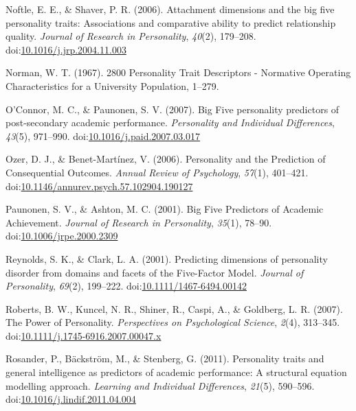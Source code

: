 \documentclass[,man]{apa6}
\theoremstyle{definition}
\theoremstyle{definition}
\theoremstyle{definition}
\theoremstyle{remark}
\begin{document}
\leavevmode\hypertarget{ref-Noftle2006}{}%
Noftle, E. E., \& Shaver, P. R. (2006). Attachment dimensions and the
big five personality traits: Associations and comparative ability to
predict relationship quality. \emph{Journal of Research in Personality},
\emph{40}(2), 179--208.
doi:\href{https://doi.org/10.1016/j.jrp.2004.11.003}{10.1016/j.jrp.2004.11.003}

\leavevmode\hypertarget{ref-Norman1967}{}%
Norman, W. T. (1967). 2800 Personality Trait Descriptors - Normative
Operating Characteristics for a University Population, 1--279.

\leavevmode\hypertarget{ref-OConnor2007}{}%
O'Connor, M. C., \& Paunonen, S. V. (2007). Big Five personality
predictors of post-secondary academic performance. \emph{Personality and
Individual Differences}, \emph{43}(5), 971--990.
doi:\href{https://doi.org/10.1016/j.paid.2007.03.017}{10.1016/j.paid.2007.03.017}

\leavevmode\hypertarget{ref-OzerBenet2006}{}%
Ozer, D. J., \& Benet-Martínez, V. (2006). Personality and the
Prediction of Consequential Outcomes. \emph{Annual Review of
Psychology}, \emph{57}(1), 401--421.
doi:\href{https://doi.org/10.1146/annurev.psych.57.102904.190127}{10.1146/annurev.psych.57.102904.190127}

\leavevmode\hypertarget{ref-Paunonen2001}{}%
Paunonen, S. V., \& Ashton, M. C. (2001). Big Five Predictors of
Academic Achievement. \emph{Journal of Research in Personality},
\emph{35}(1), 78--90.
doi:\href{https://doi.org/10.1006/jrpe.2000.2309}{10.1006/jrpe.2000.2309}

\leavevmode\hypertarget{ref-ClarkReynolds2001}{}%
Reynolds, S. K., \& Clark, L. A. (2001). Predicting dimensions of
personality disorder from domains and facets of the Five-Factor Model.
\emph{Journal of Personality}, \emph{69}(2), 199--222.
doi:\href{https://doi.org/10.1111/1467-6494.00142}{10.1111/1467-6494.00142}

\leavevmode\hypertarget{ref-Roberts2007a}{}%
Roberts, B. W., Kuncel, N. R., Shiner, R., Caspi, A., \& Goldberg, L. R.
(2007). The Power of Personality. \emph{Perspectives on Psychological
Science}, \emph{2}(4), 313--345.
doi:\href{https://doi.org/10.1111/j.1745-6916.2007.00047.x}{10.1111/j.1745-6916.2007.00047.x}

\leavevmode\hypertarget{ref-Rosander2011}{}%
Rosander, P., Bäckström, M., \& Stenberg, G. (2011). Personality traits
and general intelligence as predictors of academic performance: A
structural equation modelling approach. \emph{Learning and Individual
Differences}, \emph{21}(5), 590--596.
doi:\href{https://doi.org/10.1016/j.lindif.2011.04.004}{10.1016/j.lindif.2011.04.004}
\end{document}
